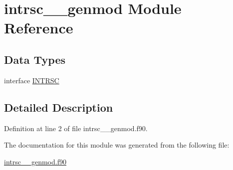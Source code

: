 \hypertarget{classintrsc____genmod}{\section{intrsc\+\_\+\+\_\+genmod Module Reference}
\label{classintrsc____genmod}
}
\subsection*{Data Types}
\begin{DoxyCompactItemize}
\item 
interface \hyperlink{interfaceintrsc____genmod_1_1INTRSC}{I\+N\+T\+R\+S\+C}
\end{DoxyCompactItemize}


\subsection{Detailed Description}


Definition at line 2 of file intrsc\+\_\+\+\_\+genmod.\+f90.



The documentation for this module was generated from the following file\+:\begin{DoxyCompactItemize}
\item 
\hyperlink{intrsc____genmod_8f90}{intrsc\+\_\+\+\_\+genmod.\+f90}\end{DoxyCompactItemize}
